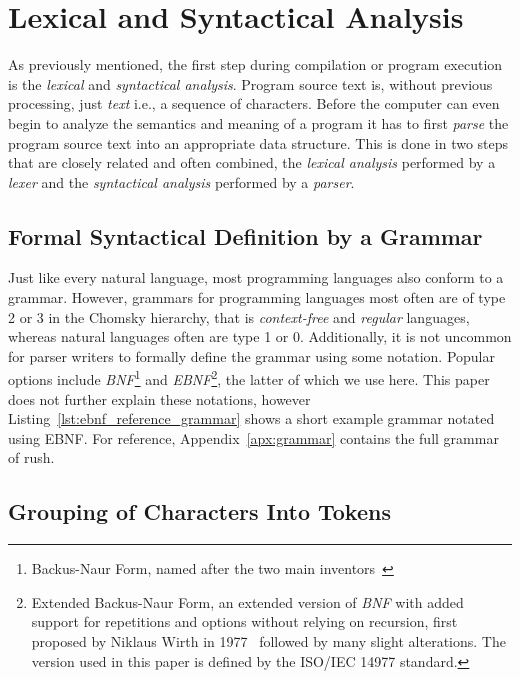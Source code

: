 \section{Lexical and Syntactical Analysis}

As previously mentioned, the first step during compilation or program execution is the \emph{lexical} and \emph{syntactical analysis}.
Program source text is, without previous processing, just \emph{text} i.e., a sequence of characters.
Before the computer can even begin to analyze the semantics and meaning of a program it has to first \emph{parse} the program source text into an appropriate data structure.
This is done in two steps that are closely related and often combined, the \emph{lexical analysis} performed by a \emph{lexer} and the \emph{syntactical analysis} performed by a \emph{parser}.

\subsection{Formal Syntactical Definition by a Grammar}

Just like every natural language, most programming languages also conform to a grammar.
However, grammars for programming languages most often are of type 2 or 3 in the Chomsky hierarchy, that is \emph{context-free} and \emph{regular} languages, whereas natural languages often are type 1 or 0.
Additionally, it is not uncommon for parser writers to formally define the grammar using some notation.
Popular options include \emph{BNF}\footnote{Backus-Naur Form, named after the two main inventors~\cite{Backus1960}} and \emph{EBNF}\footnote{Extended Backus-Naur Form, an extended version of \emph{BNF} with added support for repetitions and options without relying on recursion, first proposed by Niklaus Wirth in 1977~\cite{Wirth1977} followed by many slight alterations. The version used in this paper is defined by the ISO/IEC 14977 standard.},  the latter of which we use here.
This paper does not further explain these notations, however Listing~\ref{lst:ebnf_reference_grammar} shows a short example grammar notated using EBNF.
For reference, Appendix~\ref{apx:grammar} contains the full grammar of rush.


\subsection{Grouping of Characters Into Tokens}

